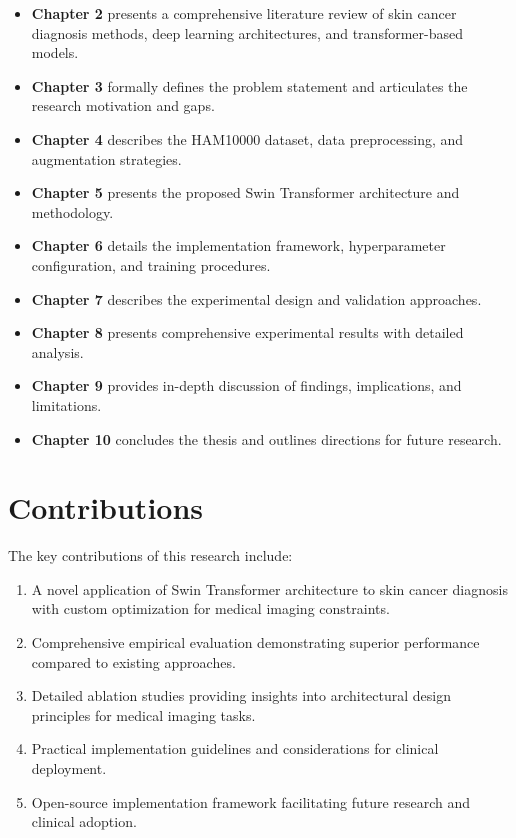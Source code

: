 \begin{itemize}
    \item \textbf{Chapter 2} presents a comprehensive literature review of skin cancer diagnosis methods, deep learning architectures, and transformer-based models.
    
    \item \textbf{Chapter 3} formally defines the problem statement and articulates the research motivation and gaps.
    
    \item \textbf{Chapter 4} describes the HAM10000 dataset, data preprocessing, and augmentation strategies.
    
    \item \textbf{Chapter 5} presents the proposed Swin Transformer architecture and methodology.
    
    \item \textbf{Chapter 6} details the implementation framework, hyperparameter configuration, and training procedures.
    
    \item \textbf{Chapter 7} describes the experimental design and validation approaches.
    
    \item \textbf{Chapter 8} presents comprehensive experimental results with detailed analysis.
    
    \item \textbf{Chapter 9} provides in-depth discussion of findings, implications, and limitations.
    
    \item \textbf{Chapter 10} concludes the thesis and outlines directions for future research.
\end{itemize}

\section{Contributions}

The key contributions of this research include:

\begin{enumerate}
    \item A novel application of Swin Transformer architecture to skin cancer diagnosis with custom optimization for medical imaging constraints.
    
    \item Comprehensive empirical evaluation demonstrating superior performance compared to existing approaches.
    
    \item Detailed ablation studies providing insights into architectural design principles for medical imaging tasks.
    
    \item Practical implementation guidelines and considerations for clinical deployment.
    
    \item Open-source implementation framework facilitating future research and clinical adoption.
\end{enumerate}

